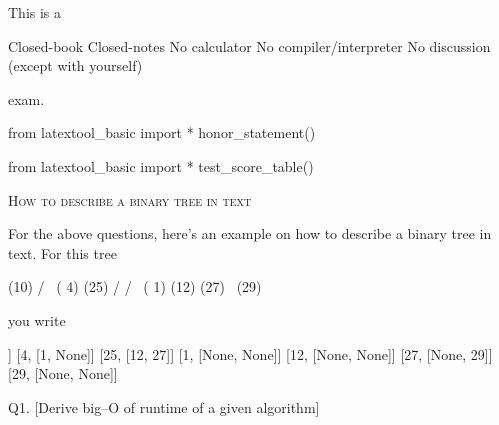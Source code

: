 

\renewcommand\AUTHOR{} %
  

\topmattertwo

This is a
\begin{enumerate}
  \li Closed-book
  \li Closed-notes
  \li No calculator
  \li No compiler/interpreter
  \li No discussion (except with yourself)
\end{enumerate}
exam.

\newcommand\abox[1]{
  \begin{flushright}
    ANSWER:
    \newsolutionboxone{0.5in}{0.25in}{\instructoronly{#1}}
  \end{flushright}
  }

\begin{python}
from latextool_basic import *
honor_statement()
\end{python}

\newpage
\begin{python}
from latextool_basic import *
test_score_table()
\end{python}


\newpage
\textsc{How to describe a binary tree in text}

For the above questions,
here's an example on how to describe a binary tree in text.
For this tree
\begin{console}[fontsize=\footnotesize]
            (10)
          /      \
      ( 4)        (25)
     /           /    \
 ( 1)        (12)      (27)
                           \
                            (29)          
\end{console}
you write
\begin{console}[fontsize=\footnotesize]
[10, [4, 25]]
[4, [1, None]]
[25, [12, 27]]
[1, [None, None]]
[12, [None, None]]
[27, [None, 29]]
[29, [None, None]]
\end{console}

\newpage
Q1. [Derive big--O of runtime of a given algorithm]

